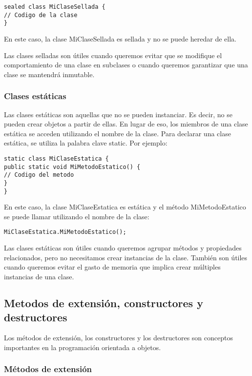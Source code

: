 \documentclass[executivepaper]{article}
\begin{document}
\begin{lstlisting}
sealed class MiClaseSellada {
// Codigo de la clase
}
\end{lstlisting}

En este caso, la clase MiClaseSellada es sellada y no se puede heredar de ella.

Las clases selladas son útiles cuando queremos evitar que se modifique el comportamiento de una clase en subclases o cuando queremos garantizar que una clase se mantendrá inmutable.

\subsubsection{Clases estáticas}

Las clases estáticas son aquellas que no se pueden instanciar. Es decir, no se pueden crear objetos a partir de ellas. En lugar de eso, los miembros de una clase estática se acceden utilizando el nombre de la clase. Para declarar una clase estática, se utiliza la palabra clave static. Por ejemplo:

\begin{lstlisting}
static class MiClaseEstatica {
public static void MiMetodoEstatico() {
// Codigo del metodo
}
}
\end{lstlisting}

En este caso, la clase MiClaseEstatica es estática y el método MiMetodoEstatico se puede llamar utilizando el nombre de la clase:

\begin{lstlisting}
MiClaseEstatica.MiMetodoEstatico();
\end{lstlisting}

Las clases estáticas son útiles cuando queremos agrupar métodos y propiedades relacionados, pero no necesitamos crear instancias de la clase. También son útiles cuando queremos evitar el gasto de memoria que implica crear múltiples instancias de una clase.

\subsection{Metodos de extensión, constructores y destructores}

Los métodos de extensión, los constructores y los destructores son conceptos importantes en la programación orientada a objetos.

\subsubsection*{Métodos de extensión}
\end{document}
